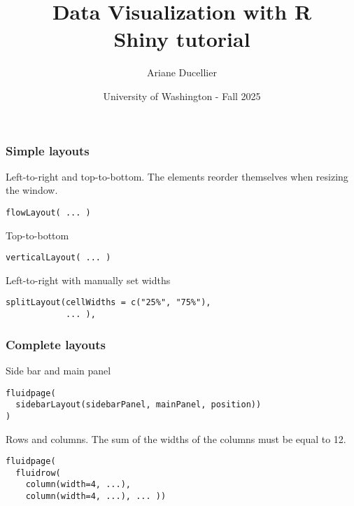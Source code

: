 \documentclass{beamer}
\title[Data Visualization with R - Shiny tutorial]{Data Visualization with R \\ Shiny tutorial}
\author{Ariane Ducellier}
\date{University of Washington - Fall 2025}
\begin{document}
	\begin{frame}
		\titlepage
	\end{frame}

	\begin{frame}[fragile]
		\frametitle{Simple layouts}
		
		Left-to-right and top-to-bottom. The elements reorder themselves when resizing the window.
		\begin{exampleblock}{}
		\begin{BVerbatim}
flowLayout( ... )
		\end{BVerbatim}
		\end{exampleblock}{}

		\vspace{1em}

		Top-to-bottom
		\begin{exampleblock}{}
		\begin{BVerbatim}
verticalLayout( ... )
		\end{BVerbatim}
		\end{exampleblock}{}

		\vspace{1em}

		Left-to-right with manually set widths
		\begin{exampleblock}{}
		\begin{lstlisting}
splitLayout(cellWidths = c("25%", "75%"),
            ... ),
		\end{lstlisting}
		\end{exampleblock}{}

	\end{frame}

	\begin{frame}[fragile]
		\frametitle{Complete layouts}
		
		Side bar and main panel
		\begin{exampleblock}{}
		\begin{BVerbatim}
fluidpage(
  sidebarLayout(sidebarPanel, mainPanel, position))
)
		\end{BVerbatim}
		\end{exampleblock}{}

		\vspace{1em}

		Rows and columns. The sum of the widths of the columns must be equal to 12.
		\begin{exampleblock}{}
		\begin{BVerbatim}
fluidpage(
  fluidrow(
    column(width=4, ...),
    column(width=4, ...), ... ))
		\end{BVerbatim}
		\end{exampleblock}{}

	\end{frame}
\end{document}

